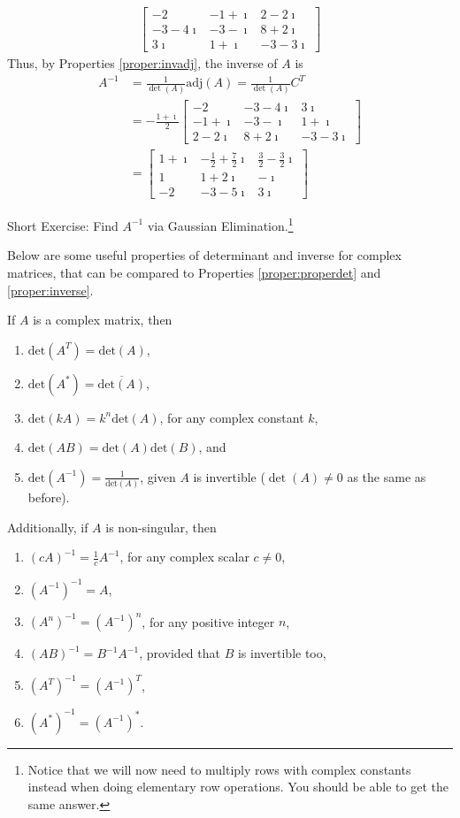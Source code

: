 \begin{solution}
\begin{align*}
\begin{bmatrix}
-2 & -1+\imath & 2-2\imath \\
-3-4\imath & -3-\imath & 8+2\imath \\
3\imath & 1+\imath & -3-3\imath
\end{bmatrix}
\end{align*}
Thus, by Properties \ref{proper:invadj}, the inverse of $A$ is
\begin{align*}
A^{-1} &= \frac{1}{\det(A)} \text{adj}(A) = \frac{1}{\det(A)} C^T \\
&= -\frac{1+\imath}{2} 
\begin{bmatrix}
-2 & -3-4\imath & 3\imath \\
-1+\imath & -3-\imath & 1+\imath \\
2-2\imath & 8+2\imath & -3-3\imath
\end{bmatrix} \\
&= 
\begin{bmatrix}
1+\imath & -\frac{1}{2}+\frac{7}{2}\imath & \frac{3}{2}-\frac{3}{2}\imath \\
1 & 1+2\imath & -\imath \\
-2 & -3-5\imath & 3\imath
\end{bmatrix} 
\end{align*}
\end{solution}

Short Exercise: Find $A^{-1}$ via Gaussian Elimination.\footnote{Notice that we will now need to multiply rows with complex constants instead when doing elementary row operations. You should be able to get the same answer.}

Below are some useful properties of determinant and inverse for complex matrices, that can be compared to Properties \ref{proper:properdet} and \ref{proper:inverse}.
\begin{proper}
If $A$ is a complex matrix, then
\begin{enumerate}
\item $\text{det}(A^T) = \text{det}(A)$,
\item $\text{det}(A^*) = \overline{\text{det}(A)}$,
\item $\text{det}(kA) = k^n \text{det}(A)$, for any complex constant $k$,
\item $\text{det}(AB) = \text{det}(A)\text{det}(B)$, and
\item $\text{det}(A^{-1}) = \frac{1}{\text{det}(A)}$, given $A$ is invertible ($\det(A) \neq 0$ as the same as before).
\end{enumerate}
Additionally, if $A$ is non-singular, then
\begin{enumerate}
\item $(cA)^{-1} = \frac{1}{c}A^{-1}$, for any complex scalar $c \neq 0$,
\item $(A^{-1})^{-1} = A$,
\item $(A^n)^{-1} = (A^{-1})^n$, for any positive integer $n$,
\item $(AB)^{-1} = B^{-1}A^{-1}$, provided that $B$ is invertible too,
\item $(A^T)^{-1} = (A^{-1})^T$,
\item $(A^*)^{-1} = (A^{-1})^*$.
\end{enumerate}
\end{proper}

